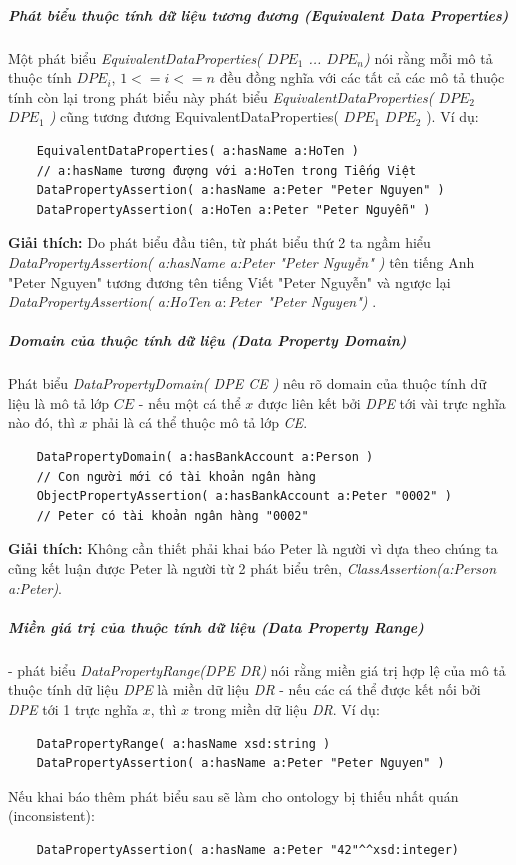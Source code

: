 	\subparagraph{Phát biểu thuộc tính dữ liệu tương đương (Equivalent Data Properties)} Một phát biểu \textit{EquivalentDataProperties( $DPE_{1}$ ... $DPE_{n}$)} nói rằng mỗi mô tả thuộc tính $DPE_{i}$, $1<=i<=n$ đều đồng nghĩa với các tất cả các mô tả thuộc tính còn lại trong phát biểu này phát biểu \textit{EquivalentDataProperties( $DPE_{2}$ $DPE_{1}$ )} cũng tương đương EquivalentDataProperties( $DPE_{1}$ $DPE_{2}$ ). Ví dụ:
	\begin{verbatim}
	EquivalentDataProperties( a:hasName a:HoTen ) 
	// a:hasName tương đượng với a:HoTen trong Tiếng Việt
	DataPropertyAssertion( a:hasName a:Peter "Peter Nguyen" )
	DataPropertyAssertion( a:HoTen a:Peter "Peter Nguyễn" )
	\end{verbatim}
	\textbf{Giải thích:} Do phát biểu đầu tiên, từ phát biểu thứ 2 ta ngầm hiểu \textit{DataPropertyAssertion( a:hasName a:Peter "Peter Nguyễn" )} tên tiếng Anh "Peter Nguyen" tương đương tên tiếng Viết "Peter Nguyễn" và ngược lại \textit{DataPropertyAssertion( a:HoTen $a:Peter$ "Peter Nguyen") }.
	
	\subparagraph{Domain của thuộc tính dữ liệu (Data Property Domain)} Phát biểu \textit{DataPropertyDomain( DPE CE )} nêu rõ domain của thuộc tính dữ liệu là mô tả lớp $CE$ -  nếu một cá thể $x$ được liên kết bởi \textit{DPE} tới vài trực nghĩa nào đó, thì $x$ phải là cá thể thuộc mô tả lớp \textit{CE}.
	\begin{verbatim}
	DataPropertyDomain( a:hasBankAccount a:Person ) 
	// Con người mới có tài khoản ngân hàng
	ObjectPropertyAssertion( a:hasBankAccount a:Peter "0002" ) 
	// Peter có tài khoản ngân hàng "0002"
	\end{verbatim}
	\textbf{Giải thích:} Không cần thiết phải khai báo Peter là người vì dựa theo chúng ta cũng kết luận được Peter là người từ 2 phát biểu trên, \textit{ClassAssertion(a:Person a:Peter)}.
	
	\subparagraph{Miền giá trị của thuộc tính dữ liệu (Data Property Range)} - phát biểu \textit{DataPropertyRange(DPE DR)} nói rằng miền giá trị hợp lệ của mô tả thuộc tính dữ liệu \textit{DPE} là miền dữ liệu \textit{DR} - nếu các cá thể được kết nối bởi \textit{DPE} tới 1 trực nghĩa $x$, thì $x$ trong miền dữ liệu \textit{DR}. Ví dụ:
	\begin{verbatim}
	DataPropertyRange( a:hasName xsd:string )
	DataPropertyAssertion( a:hasName a:Peter "Peter Nguyen" )
	\end{verbatim}
	Nếu khai báo thêm phát biểu sau sẽ làm cho ontology bị thiếu nhất quán (inconsistent):
	\begin{verbatim}
	DataPropertyAssertion( a:hasName a:Peter "42"^^xsd:integer)
	\end{verbatim}
	
